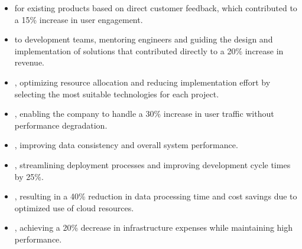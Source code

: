 \begin{itemize}
  \item {} for existing products based on direct customer feedback, which contributed to a 15\% increase in user engagement.

  \item {} to development teams, mentoring engineers and guiding the design and implementation of solutions that contributed directly to a 20\% increase in revenue.

  \item {}, optimizing resource allocation and reducing implementation effort by selecting the most suitable technologies for each project.

  \item {}, enabling the company to handle a 30\% increase in user traffic without performance degradation.

  \item {}, improving data consistency and overall system performance.

  \item {}, streamlining deployment processes and improving development cycle times by 25\%.

  \item {}, resulting in a 40\% reduction in data processing time and cost savings due to optimized use of cloud resources.

  \item {}, achieving a 20\% decrease in infrastructure expenses while maintaining high performance.

\end{itemize}

\divider

